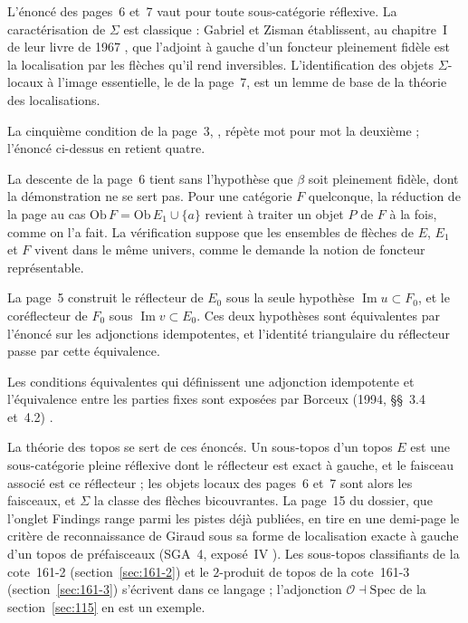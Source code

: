\begin{remarque}
L'énoncé des pages~6 et~7 vaut pour toute sous-catégorie réflexive. La caractérisation de $\Sigma$ est classique : Gabriel et Zisman établissent, au chapitre~I de leur livre de 1967 \cite{gabrielzisman1967}, que l'adjoint à gauche d'un foncteur pleinement fidèle est la localisation par les flèches qu'il rend inversibles. L'identification des objets $\Sigma$-locaux à l'image essentielle, le  de la page~7, est un lemme de base de la théorie des localisations.
\end{remarque}

\begin{remarque}
La cinquième condition de la page~3, , répète mot pour mot la deuxième ; l'énoncé ci-dessus en retient quatre.
\end{remarque}

\begin{remarque}
La descente de la page~6 tient sans l'hypothèse que $\beta$ soit pleinement fidèle, dont la démonstration ne se sert pas. Pour une catégorie $F$ quelconque, la réduction de la page au cas $\mathrm{Ob}\,F = \mathrm{Ob}\,E_1 \cup \{a\}$ revient à traiter un objet $P$ de $F$ à la fois, comme on l'a fait. La vérification suppose que les ensembles de flèches de $E$, $E_1$ et $F$ vivent dans le même univers, comme le demande la notion de foncteur représentable.
\end{remarque}

\begin{remarque}
La page~5 construit le réflecteur de $E_0$ sous la seule hypothèse $\operatorname{Im} u \subset F_0$, et le coréflecteur de $F_0$ sous $\operatorname{Im} v \subset E_0$. Ces deux hypothèses sont équivalentes par l'énoncé sur les adjonctions idempotentes, et l'identité triangulaire du réflecteur passe par cette équivalence.
\end{remarque}

\begin{remarque}
Les conditions équivalentes qui définissent une adjonction idempotente et l'équivalence entre les parties fixes sont exposées par Borceux (1994, §§~3.4 et~4.2) \cite{borceux1994}.
\end{remarque}

\begin{remarque}
La théorie des topos se sert de ces énoncés. Un sous-topos d'un topos $E$ est une sous-catégorie pleine réflexive dont le réflecteur est exact à gauche, et le faisceau associé est ce réflecteur ; les objets locaux des pages~6 et~7 sont alors les faisceaux, et $\Sigma$ la classe des flèches bicouvrantes. La page~15 du dossier, que l'onglet Findings range parmi les pistes déjà publiées, en tire en une demi-page le critère de reconnaissance de Giraud sous sa forme de localisation exacte à gauche d'un topos de préfaisceaux (SGA~4, exposé~IV \cite{sga4-1}). Les sous-topos classifiants de la cote~161-2 (section~\ref{sec:161-2}) et le $2$-produit de topos de la cote~161-3 (section~\ref{sec:161-3}) s'écrivent dans ce langage ; l'adjonction $\mathcal O \dashv \mathrm{Spec}$ de la section~\ref{sec:115} en est un exemple.
\end{remarque}

